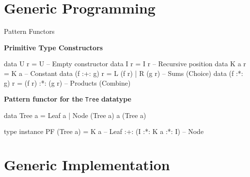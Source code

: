 \section{Generic Programming}

\begin{slide}{Pattern Functors}

\textbf{Primitive Type Constructors}

\begin{haskell}
data U r         = U                 -- Empty constructor
data I r         = I r               -- Recursive position
data K a r       = K a               -- Constant
data (f :+: g) r = L (f r) | R (g r) -- Sums (Choice)
data (f :*: g) r = (f r) :*: (g r)   -- Products (Combine)
\end{haskell}

\textbf{Pattern functor for the} \texttt{Tree} \textbf{datatype}

\begin{haskell}
data Tree a = Leaf a | Node (Tree a) a (Tree a)

type instance PF (Tree a) = K a                -- Leaf
                         :+: (I :*: K a :*: I) -- Node
\end{haskell}
\end{slide}


  





\section{Generic Implementation}

